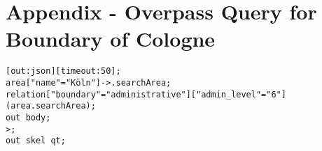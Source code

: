 \clearpage
\section{Appendix - Overpass Query for Boundary of Cologne}
\label{app:overpass_query}
\begin{verbatim}
[out:json][timeout:50];
area["name"="Köln"]->.searchArea;
relation["boundary"="administrative"]["admin_level"="6"](area.searchArea);
out body;
>;
out skel qt;
\end{verbatim}
